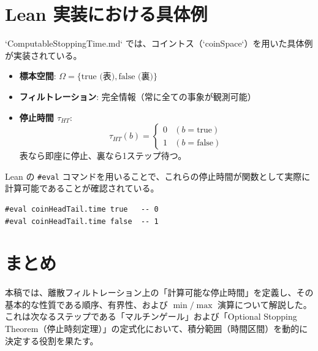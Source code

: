 \documentclass[a4paper,11pt]{article}
\theoremstyle{definition}
\begin{document}
\section{Lean 実装における具体例}

`ComputableStoppingTime.md` では、コイントス（`coinSpace`）を用いた具体例が実装されている。

\begin{itemize}
    \item \textbf{標本空間}: $\Omega = \{ \text{true (表)}, \text{false (裏)} \}$
    \item \textbf{フィルトレーション}: 完全情報（常に全ての事象が観測可能）
    \item \textbf{停止時間 $\tau_{HT}$}:
    \[ \tau_{HT}(b) = \begin{cases} 0 & (b = \text{true}) \\ 1 & (b = \text{false}) \end{cases} \]
    表なら即座に停止、裏なら1ステップ待つ。
\end{itemize}

Lean の \texttt{\#eval} コマンドを用いることで、これらの停止時間が関数として実際に計算可能であることが確認されている。
\begin{verbatim}
#eval coinHeadTail.time true   -- 0
#eval coinHeadTail.time false  -- 1
\end{verbatim}

\section{まとめ}
本稿では、離散フィルトレーション上の「計算可能な停止時間」を定義し、その基本的な性質である順序、有界性、および $\min/\max$ 演算について解説した。
これは次なるステップである「マルチンゲール」および「Optional Stopping Theorem（停止時刻定理）」の定式化において、積分範囲（時間区間）を動的に決定する役割を果たす。
\end{document}
